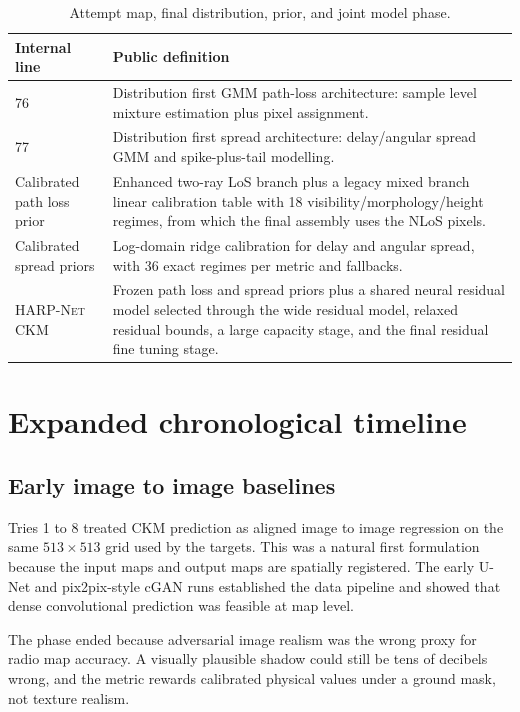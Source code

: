 \begin{table}[H]
\centering
\caption{Attempt map, final distribution, prior, and joint model phase.}
\label{tab:try_map_final}
\tiny
\renewcommand{\arraystretch}{0.78}
\setlength{\tabcolsep}{2pt}
\begin{tabularx}{\textwidth}{p{}>{\raggedright\arraybackslash}X}
\toprule
Internal line & Public definition \\
\midrule
76 & Distribution first GMM path-loss architecture: sample level mixture estimation plus pixel assignment. \\
77 & Distribution first spread architecture: delay/angular spread GMM and spike-plus-tail modelling. \\
Calibrated path loss prior & Enhanced two-ray LoS branch plus a legacy mixed branch linear calibration table with 18 visibility/morphology/height regimes, from which the final assembly uses the NLoS pixels. \\
Calibrated spread priors & Log-domain ridge calibration for delay and angular spread, with 36 exact regimes per metric and fallbacks. \\
\textsc{HARP-Net CKM} & Frozen path loss and spread priors plus a shared neural residual model selected through the wide residual model, relaxed residual bounds, a large capacity stage, and the final residual fine tuning stage. \\
\bottomrule
\end{tabularx}
\end{table}
\small

\section{Expanded chronological timeline}

\subsection{Early image to image baselines}

Tries 1 to 8 treated CKM prediction as aligned image to image regression on the
same \(513\times513\) grid used by the targets. This was a natural first
formulation because the input maps and output maps are spatially registered.
The early U-Net and pix2pix-style cGAN runs established the data pipeline and
showed that dense convolutional prediction was feasible at map level.

The phase ended because adversarial image realism was the wrong proxy for
radio map accuracy. A visually plausible shadow could still be tens of
decibels wrong, and the metric rewards calibrated physical values under a
ground mask, not texture realism.

